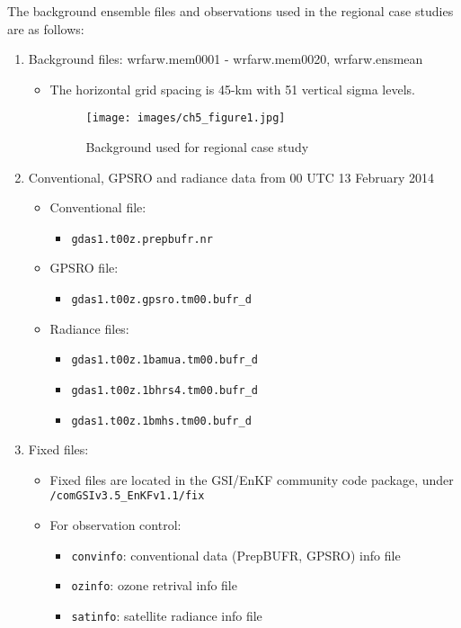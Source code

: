 The background ensemble files and observations used in the regional case studies are as follows:
\begin{enumerate}
\item Background files: wrfarw.mem0001 - wrfarw.mem0020, wrfarw.ensmean
\begin{itemize}
\item The horizontal grid spacing is 45-km with 51 vertical sigma levels.
\begin{figure}[h!]
  \centering
  \caption{Background used for regional case study}
  \texttt{[image: images/ch5\_figure1.jpg]} 
 \label{ch5_fig1}
\end{figure}
\end{itemize}
\item Conventional, GPSRO and radiance data from 00 UTC 13 February 2014
\begin{itemize}
\item Conventional file:  
\begin{itemize}
\item \verb|gdas1.t00z.prepbufr.nr|
\end{itemize}
\item GPSRO file: 
\begin{itemize}
\item \verb|gdas1.t00z.gpsro.tm00.bufr_d| 
\end{itemize}
\item Radiance files: 
\begin{itemize}
\item \verb|gdas1.t00z.1bamua.tm00.bufr_d| 
\item \verb|gdas1.t00z.1bhrs4.tm00.bufr_d| 
\item \verb|gdas1.t00z.1bmhs.tm00.bufr_d| 
\end{itemize}
\end{itemize}
\item Fixed files:
\begin{itemize}
\item Fixed files are located in the GSI/EnKF community code package, under
\verb|/comGSIv3.5_EnKFv1.1/fix|
\item For observation control:
\begin{itemize}
\item \verb|convinfo|: conventional data (PrepBUFR, GPSRO) info file 
\item \verb|ozinfo|: ozone retrival info file
\item \verb|satinfo|: satellite radiance info file 

\end{itemize}
\end{itemize}
\end{enumerate}
